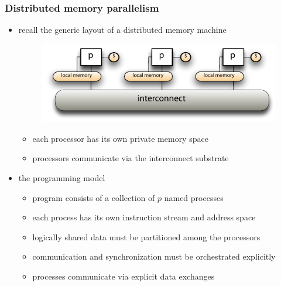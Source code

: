 %
%


\begin{frame}[fragile]
%
  \frametitle{Distributed memory parallelism}
%
  \begin{itemize}
%
  \item recall the generic layout of a distributed memory machine
%
    \begin{figure}
      \centering
      \includegraphics[scale=1.0]{figures/distributed-memory.pdf}
    \end{figure}
    \vspace{-1.0em}
%
    \begin{itemize}
      \item each processor has its own private memory space
      \item processors communicate via the interconnect substrate
    \end{itemize}
%
  \item the programming model
    \begin{itemize}
    \item program consists of a collection of $p$ named processes
      \item each process has its own instruction stream and address space
    \item logically shared data must be partitioned among the processors
    \item communication and synchronization must be orchestrated explicitly 
    \item processes communicate via explicit data exchanges
    \end{itemize}
%
  \end{itemize}
%
\end{frame}

